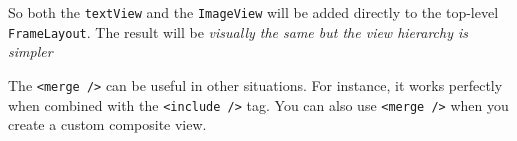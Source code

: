 \documentclass[11pt, a4paper]{book}
\begin{document}
So both the \verb|textView| and the \verb|ImageView| will be added directly to
the top-level \verb|FrameLayout|. The result will be \emph{visually the same but
the view hierarchy is simpler}

The \verb|<merge />| can be useful in other situations. For instance, it works
perfectly when combined with the \verb|<include />| tag. You can also use
\verb|<merge />| when you create a custom composite view.
\end{document}
